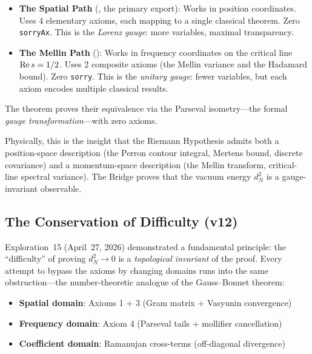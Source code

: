 \documentclass[11pt,a4paper]{article}
\begin{document}
\begin{itemize}
  \item \textbf{The Spatial Path} (,
    the primary export): Works in position coordinates. Uses 4 elementary
    axioms, each mapping to a single classical theorem. Zero \texttt{sorryAx}.
    This is the \emph{Lorenz gauge}: more variables, maximal transparency.

  \item \textbf{The Mellin Path} ():
    Works in frequency coordinates on the critical line $\operatorname{Re} s = 1/2$.
    Uses 2 composite axioms (the Mellin variance and the Hadamard bound).
    Zero \texttt{sorry}. This is the \emph{unitary gauge}: fewer
    variables, but each axiom encodes multiple classical results.
\end{itemize}

The  theorem proves their equivalence
via the Parseval isometry---the formal \emph{gauge transformation}---with
zero axioms.

Physically, this is the insight that the Riemann Hypothesis admits both
a position-space description (the Perron contour integral, Mertens bound,
discrete covariance) and a momentum-space description (the Mellin
transform, critical-line spectral variance). The Bridge proves that
the vacuum energy $d_N^2$ is a gauge-invariant observable.

\subsection{The Conservation of Difficulty (v12)}

Exploration~15 (April~27, 2026) demonstrated a fundamental principle:
the ``difficulty'' of proving $d_N^2 \to 0$ is a
\emph{topological invariant} of the proof. Every attempt to bypass
the axioms by changing domains runs into the same obstruction---the
number-theoretic analogue of the Gauss--Bonnet theorem:

\begin{itemize}
  \item \textbf{Spatial domain}: Axioms 1 + 3 (Gram matrix + Vasyunin convergence)
  \item \textbf{Frequency domain}: Axiom 4 (Parseval tails + mollifier cancellation)
  \item \textbf{Coefficient domain}: Ramanujan cross-terms (off-diagonal divergence)
\end{itemize}
\end{document}
